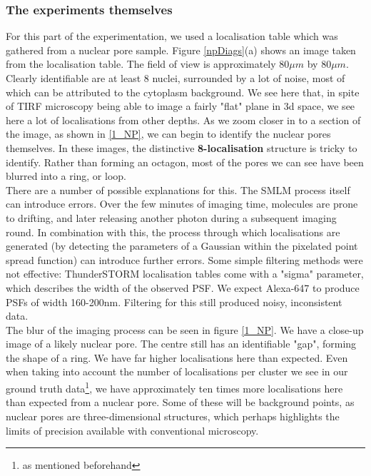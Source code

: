 \documentclass[11pt]{article}
\begin{document}
\subsubsection{The experiments themselves}

For this part of the experimentation, we used a localisation table which was gathered from a nuclear pore sample. Figure \ref{npDiags}(a) shows an image taken from the localisation table. The field of view is approximately 80$\mu m$ by 80$\mu m$. Clearly identifiable are at least 8 nuclei, surrounded by a lot of noise, most of which can be attributed to the cytoplasm background. We see here that, in spite of TIRF microscopy being able to image a fairly "flat" plane in 3d space, we see here a lot of localisations from other depths. As we zoom closer in to a section of the image, as shown in \ref{1_NP}, we can begin to identify the nuclear pores themselves. In these images, the distinctive \textbf{8-localisation} structure is tricky to identify. Rather than forming an octagon, most of the pores we can see have been blurred into a ring, or loop. \\

There are a number of possible explanations for this. The SMLM process itself can introduce errors. Over the few minutes of imaging time, molecules are prone to drifting, and later releasing another photon during a subsequent imaging round. In combination with this, the process through which localisations are generated (by detecting the parameters of a Gaussian within the pixelated point spread function) can introduce further errors. Some simple filtering methods were not effective: ThunderSTORM localisation tables come with a "sigma" parameter, which describes the width of the observed PSF. We expect Alexa-647 to produce PSFs of width 160-200nm\cite{thunderstorm}. Filtering for this still produced noisy, inconsistent data.\\

The blur of the imaging process can be seen in figure \ref{1_NP}. We have a close-up image of a likely nuclear pore. The centre still has an identifiable "gap", forming the shape of a ring. We have far higher localisations here than expected. Even when taking into account the number of localisations per cluster we see in our ground truth data\footnote{as mentioned beforehand}, we have approximately ten times more localisations here than expected from a nuclear pore. Some of these will be background points, as nuclear pores are three-dimensional structures, which perhaps highlights the limits of precision available with conventional microscopy.\\
\end{document}
